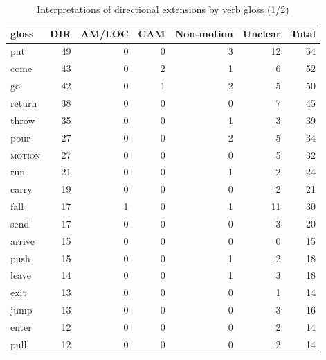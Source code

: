 \begin{table}
	\caption{Interpretations of directional extensions by verb gloss (1/2)}
	\label{tab:interpretation1}
	\begin{tabular}{lrrrrrr} %
		\lsptoprule
	gloss &   	DIR &  AM/LOC &   CAM &  Non-motion &  Unclear &  Total \\
\midrule
put         &   49 &             0 &    0 &           3 &       12 &     64 \\
come        &   43 &             0 &    2 &           1 &        6 &     52 \\
go          &   42 &             0 &    1 &           2 &        5 &     50 \\
return      &   38 &             0 &    0 &           0 &        7 &     45 \\
throw       &   35 &             0 &    0 &           1 &        3 &     39 \\
pour        &   27 &             0 &    0 &           2 &        5 &     34 \\
\textsc{motion}      &   27 &             0 &    0 &           0 &        5 &     32 \\
run         &   21 &             0 &    0 &           1 &        2 &     24 \\
carry       &   19 &             0 &    0 &           0 &        2 &     21 \\
fall        &   17 &             1 &    0 &           1 &       11 &     30 \\
send        &   17 &             0 &    0 &           0 &        3 &     20 \\
arrive      &   15 &             0 &    0 &           0 &        0 &     15 \\
push        &   15 &             0 &    0 &           1 &        2 &     18 \\
leave       &   14 &             0 &    0 &           1 &        3 &     18 \\
exit        &   13 &             0 &    0 &           0 &        1 &     14 \\
jump        &   13 &             0 &    0 &           0 &        3 &     16 \\
enter       &   12 &             0 &    0 &           0 &        2 &     14 \\
pull        &   12 &             0 &    0 &           0 &        2 &     14 \\

\end{tabular}
\end{table}
